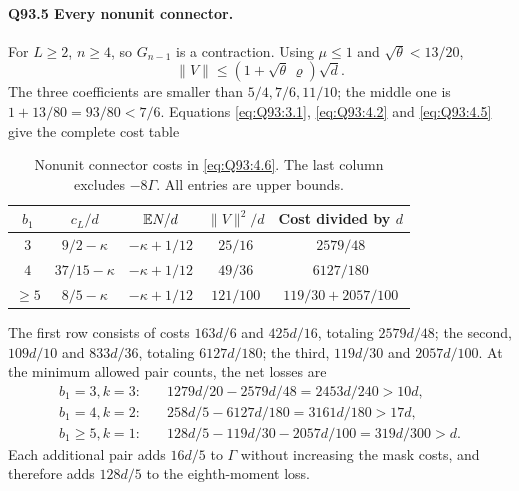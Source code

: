 \paragraph{Q93.5 Every nonunit connector.}
For \(L\ge2\), \(n\ge4\), so \(G_{n-1}\) is a contraction.
Using \(\mu\le1\) and \(\sqrt\theta<13/20\),
\begin{equation}\tag{Q93.5.1}\label{eq:Q93:5.1}
\|V\|\le(1+\sqrt\theta\,\varrho)\sqrt d.
\end{equation}
The three coefficients are smaller than \(5/4,7/6,11/10\);
the middle one is \(1+13/80=93/80<7/6\).
Equations \eqref{eq:Q93:3.1}, \eqref{eq:Q93:4.2} and
\eqref{eq:Q93:4.5} give the complete cost table
\begin{table}[htbp]
\centering\small
\setlength{\tabcolsep}{5pt}
\caption{Nonunit connector costs in \eqref{eq:Q93:4.6}. The last column excludes $-8\Gamma$. All entries are upper bounds.}\label{tab:oc:q93-nonunit-cost}
\begin{tabular}{ccccc}
\toprule
$b_1$ & $c_L/d$ & $\mathbb E N/d$ & $\|V\|^2/d$ & Cost divided by $d$\\
\midrule
$3$ & $9/2-\kappa$ & $-\kappa+1/12$ & $25/16$ & $2579/48$\\
$4$ & $37/15-\kappa$ & $-\kappa+1/12$ & $49/36$ & $6127/180$\\
$\ge5$ & $8/5-\kappa$ & $-\kappa+1/12$ & $121/100$ & $119/30+2057/100$\\
\bottomrule
\end{tabular}
\end{table}
The first row consists of costs \(163d/6\) and \(425d/16\), totaling
\(2579d/48\); the second, \(109d/10\) and \(833d/36\), totaling
\(6127d/180\); the third, \(119d/30\) and \(2057d/100\).
At the minimum allowed pair counts, the net losses are
\begin{equation}\tag{Q93.5.2}\label{eq:Q93:5.2}
\begin{aligned}
b_1=3, k=3:&\quad1279d/20-2579d/48=2453d/240>10d,\\
b_1=4, k=2:&\quad258d/5-6127d/180=3161d/180>17d,\\
b_1\ge5, k=1:&\quad128d/5-119d/30-2057d/100=319d/300>d.
\end{aligned}
\end{equation}
Each additional pair adds \(16d/5\) to \(\Gamma\) without increasing
the mask costs, and therefore adds \(128d/5\) to the eighth-moment loss.

